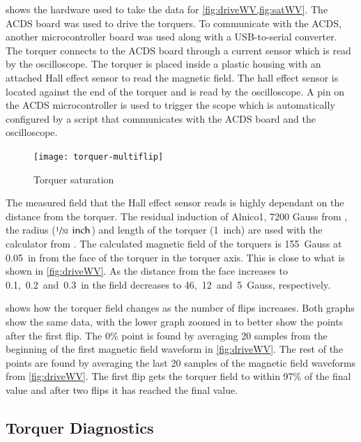  shows the hardware used to take the data for \cref{fig:driveWV,fig:satWV}. The \ac{ACDS} board was used to drive the torquers. To communicate with the \ac{ACDS}, another microcontroller board was used along with a \ac{USB}-to-serial converter. The torquer connects to the \ac{ACDS} board through a current sensor which is read by the oscilloscope. The torquer is placed inside a plastic housing with an attached Hall effect sensor to read the magnetic field. The hall effect sensor is located against the end of the torquer and is read by the oscilloscope. A pin on the \ac{ACDS} microcontroller is  used to trigger the scope which is automatically configured by a \matlab script that communicates with the \ac{ACDS} board and the oscilloscope.

\begin{figure}[htb!]
    \centering
    \texttt{[image: torquer-multiflip]}
    \caption{Torquer saturation}
    \label{fig:satWV}
\end{figure}


The measured field that the Hall effect sensor reads is highly dependant on the distance from the torquer. The residual induction of Alnico1, 7200 Gauss from \cite{AlnicoProp}, the radius ($\sfrac{1}{32}~\, \mathrm{inch}$) and length of the torquer (1~inch) are used with the calculator from \cite{DexterField}. The calculated magnetic field of the torquers is 155~Gauss at 0.05~in from the face of the torquer in the torquer axis. This is close to what is shown in \cref{fig:driveWV}. As the distance from the face increases to 0.1,~0.2~and~0.3~in the field decreases to 46,~12~and~5~Gauss, respectively.

 shows how the torquer field changes as the number of flips increases. Both graphs show the same data, with the lower graph zoomed in to better show the points after the first flip. The 0\% point is found by averaging 20 samples from the beginning of the first magnetic field waveform in \cref{fig:driveWV}. The rest of the points are found by averaging the last 20 samples of the magnetic field waveforms from \cref{fig:driveWV}. The first flip gets the torquer field to within 97\% of the final value and after two flips it has reached the final value. 

\subsection{Torquer Diagnostics}

